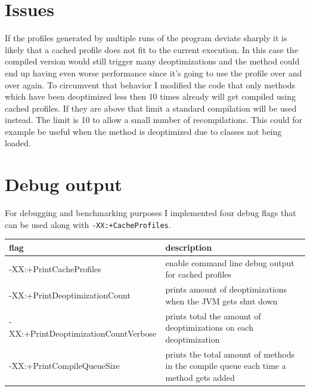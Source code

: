 \section{Issues}
\label{s:issues}
If the profiles generated by multiple runs of the program deviate sharply it is likely that a cached profile does not fit to the current execution. In this case the compiled version would still trigger many deoptimizations and the method could end up having even worse performance since it's going to use the profile over and over again.
To circumvent that behavior I modified the code that only methods which have been deoptimized less then 10 times already will get compiled using cached profiles. If they are above that limit a standard compilation will be used instead.
The limit is 10 to allow a small number of recompilations. This could for example be useful when the method is deoptimized due to classes not being loaded. 
\section{Debug output}
\label{s:debugoutput}
For debugging and benchmarking purposes I implemented four debug flags that can be used along with \texttt{-XX:+CacheProfiles}.
\begin{table}[ht]
  \centering
  \label{t:debugflags}
  \begin{center}
    \begin{tabular}{| l | p{9.0cm} |}
       \hline
       \textbf{flag} & \textbf{description} \\ \hline\hline
       -XX:+PrintCacheProfiles & enable command line debug output for cached profiles\\ \hline
       -XX:+PrintDeoptimizationCount & prints amount of deoptimizations when the JVM gets shut down\\ \hline
       -XX:+PrintDeoptimizationCountVerbose & prints total the amount of deoptimizations on each deoptimization\\ \hline
       -XX:+PrintCompileQueueSize & prints the total amount of methods in the compile queue each time a method gets added \\ \hline
    \end{tabular}
  \end{center}
\end{table}

 
